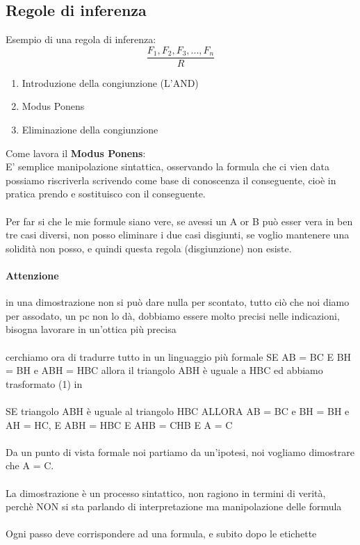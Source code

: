 \documentclass[12pt, a4paper, openany, oneside]{book}
\begin{document}
\subsection{Regole di inferenza}
Esempio di una regola di inferenza:
\[
\frac{F_{1}, F_{2}, F_{3}, ..., F_{n}}{R}
\]
\begin{enumerate}
	\item Introduzione della congiunzione (L'AND)
	\item Modus Ponens
	\item Eliminazione della congiunzione
\end{enumerate}
Come lavora il \textbf{Modus Ponens}: \\
E' semplice manipolazione sintattica, osservando la formula che ci vien data
possiamo riscriverla scrivendo come base di conoscenza il conseguente, 
cioè in pratica prendo e sostituisco con il conseguente.
\\ \\
Per far si che le mie formule siano vere, se avessi un A or B può esser vera in 
ben tre casi diversi, non posso eliminare i due casi disgiunti, se voglio 
mantenere una solidità non posso, e quindi questa regola (disgiunzione) non 
esiste.
\paragraph{Attenzione} in una dimostrazione non si può dare nulla per 
scontato, tutto ciò che noi diamo per assodato, un pc non lo dà, dobbiamo 
essere molto precisi nelle indicazioni, bisogna lavorare in un'ottica più 
precisa
\\ \\
cerchiamo ora di tradurre tutto in un linguaggio più formale
SE AB = BC E BH = BH e ABH = HBC allora il triangolo ABH è uguale a HBC 
ed abbiamo trasformato (1) in \\ \\
SE triangolo ABH è uguale al triangolo HBC ALLORA AB = BC e BH = BH e AH = HC,
E ABH = HBC E AHB = CHB E A = C
\\ \\
Da un punto di vista formale noi partiamo da un'ipotesi, noi vogliamo 
dimostrare che A = C.
\\ \\
La dimostrazione è un processo sintattico, non ragiono in termini di verità, 
perchè NON si sta parlando di interpretazione ma manipolazione delle formula
\\ \\
Ogni passo deve corrispondere ad una formula, e subito dopo le etichette
\end{document}
